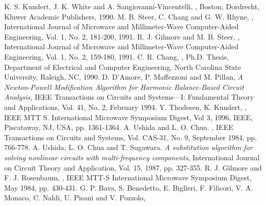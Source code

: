 \begin{thebibliography}{99}
%
K. S. Kundert, J. K. White and
A. Sangiovanni-Vincentelli, , \newblock Boston,
Dordrecht, Kluwer Academic Publishers, 1990.
%
M. B. Steer, C. Chang and G. W. Rhyne,
, \newblock International Journal of Microwave and Millimeter-Wave
Computer-Aided Engineering, Vol. 1, No. 2, 181-200, 1991.
%
R. J. Gilmore and M. B. Steer, , \newblock International
Journal of Microwave and Millimeter-Wave Computer-Aided Engineering,
Vol. 1, No. 2, 159-180, 1991.
%
C. R. Chang, , \newblock Ph.D. Thesis, Department of Electrical
and Computer Engineering, North Carolina State University, Raleigh,
NC, 1990.
%
D. D'Amore, P. Maffezzoni and M. Pillan, \newblock
{\em A Newton-Powell Modification Algorithm for Harmonic Balance-Based
Circuit Analysis}, \newblock IEEE Transactions on Circuits and
Systems---I: Fundamental Theory and Applications, Vol. 41, No. 2,
February 1994.
%
Y. Thodesen, K. Kundert, , IEEE MTT S. International Microwave
\newblock Symposium Digest, Vol 3, 1996, IEEE, Piscataway, NJ, USA,
pp. 1361-1364.
%
A. Ushida and L. O. Chua.  , \newblock IEEE Transactions on Circuits and Systems,
Vol. CAS-31, No. 9, September 1984, pp. 766-778.
%
A. Ushida, L. O. Chua and T. Sugawara.  \newblock
{\em A substitution algorithm for solving nonlinear circuits with
multi-frequency components}, \newblock International Journal on
Circuit Theory and Application, Vol. 15, 1987, pp. 327-355.
%
R. J. Gilmore and F. J. Rosenbaum, , 
IEEE MTT-S International Microwave Symposium Digest, May 1984,
pp. 430-431.
%
G. P. Bava, S. Benedetto, E. Biglieri, F. Filicori,
V. A. Monaco, C. Naldi, U. Pisani and V. Pozzolo, 
\end{thebibliography}
